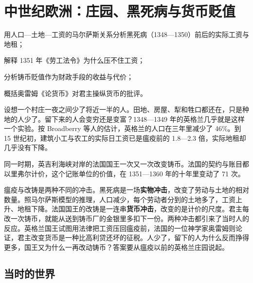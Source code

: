 \chapter{中世纪欧洲：庄园、黑死病与货币贬值}\label{ch:medieval}

\begin{chapterguide}
\begin{guidegoals}
\item 用人口—土地—工资的马尔萨斯关系分析黑死病（1348—1350）前后的实际工资与地租；
\item 解释 1351 年《劳工法令》为什么压不住工资；
\item 分析铸币贬值作为财政手段的收益与代价；
\item 概括奥雷姆《论货币》对君主操纵货币的批评。
\end{guidegoals}
\end{chapterguide}

设想一个村庄一夜之间少了将近一半的人。田地、房屋、犁和牲口都还在，只是种地的人少了。留下来的人会变穷还是变富？1348—1349 年的英格兰几乎就是这样一个实验。按 Broadberry 等人的估计，英格兰的人口在三年里减少了 46\%\cite{broadberry2015}。到 15 世纪初，建筑小工与农工的实际日工资已是瘟疫前的 1.8—2.3 倍，实际地租却几乎没有下降\cite{clark2010}。

同一时期，英吉利海峡对岸的法国国王一次又一次改变铸币。法国的契约与账目都以里弗尔计价，这个记账单位的价值，在 1351—1360 年的十年里变动了 71 次\cite{wailly1857}。

瘟疫与改铸是两种不同的冲击。黑死病是一场\textbf{实物冲击}，改变了劳动与土地的相对数量。照马尔萨斯模型的推理，人口减少，每个劳动者分到的土地多了，工资上升、地租下降。法国国王的改铸是一连串\textbf{货币冲击}，改变的是计价的尺度。君主每改一次铸币，就能从送到铸币厂的金银里多扣下一份。两种冲击都引来了当时人的反应。英格兰国王试图用法律把工资压回瘟疫前，法国的一位神学家奥雷姆则论证，君主改变货币是一种比高利贷还坏的征税。人少了，留下的人为什么反而挣得更多，国王又为什么一再改动铸币？答案要从瘟疫以前的英格兰庄园说起。

\section{当时的世界}\label{sec:medieval-world}

